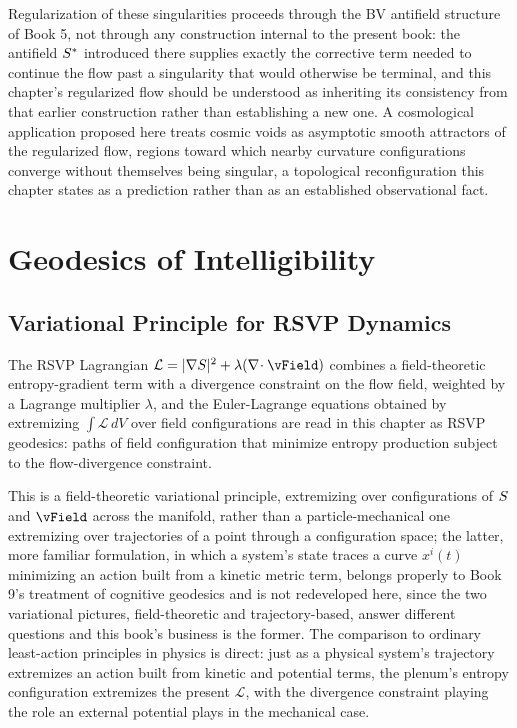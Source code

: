 Regularization of these singularities proceeds through the BV antifield structure of Book 5, not through any construction internal to the present book: the antifield $S^{*}$ introduced there supplies exactly the corrective term needed to continue the flow past a singularity that would otherwise be terminal, and this chapter's regularized flow should be understood as inheriting its consistency from that earlier construction rather than establishing a new one. A cosmological application proposed here treats cosmic voids as asymptotic smooth attractors of the regularized flow, regions toward which nearby curvature configurations converge without themselves being singular, a topological reconfiguration this chapter states as a prediction rather than as an established observational fact.

\part{Geodesics of Intelligibility}

\chapter{Variational Principle for RSVP Dynamics}

The RSVP Lagrangian $\mathcal{L} = |\grad \SEntropy|^2 + \lambda (\diverg \vField)$ combines a field-theoretic entropy-gradient term with a divergence constraint on the flow field, weighted by a Lagrange multiplier $\lambda$, and the Euler-Lagrange equations obtained by extremizing $\int \mathcal{L}\, dV$ over field configurations are read in this chapter as RSVP geodesics: paths of field configuration that minimize entropy production subject to the flow-divergence constraint.

This is a field-theoretic variational principle, extremizing over configurations of $S$ and $\vField$ across the manifold, rather than a particle-mechanical one extremizing over trajectories of a point through a configuration space; the latter, more familiar formulation, in which a system's state traces a curve $x^i(t)$ minimizing an action built from a kinetic metric term, belongs properly to Book 9's treatment of cognitive geodesics and is not redeveloped here, since the two variational pictures, field-theoretic and trajectory-based, answer different questions and this book's business is the former. The comparison to ordinary least-action principles in physics is direct: just as a physical system's trajectory extremizes an action built from kinetic and potential terms, the plenum's entropy configuration extremizes the present $\mathcal{L}$, with the divergence constraint playing the role an external potential plays in the mechanical case.

